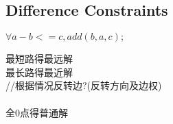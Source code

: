 \subsection{Difference Constraints}
$\forall a - b <= c, add(b,a,c);$

最短路得最远解\\
最长路得最近解\\
//根据情况反转边?(反转方向及边权)\\
\\
全0点得普通解\\
